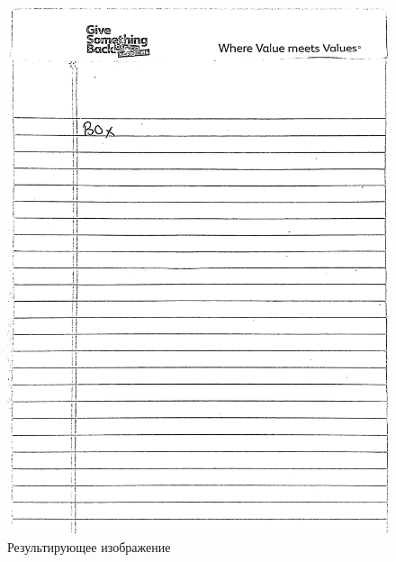 \begin{figure}
    \includegraphics[scale=0.15]{img/perspective/output}
    \caption{Результирующее изображение}
    \label{preprocess_out}
\end{figure}